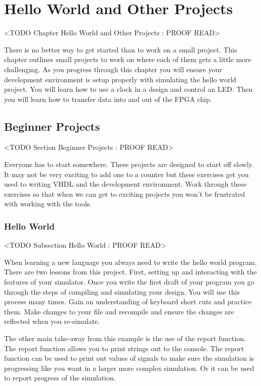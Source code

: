 \chapter{Hello World and Other Projects}
	<TODO Chapter Hello World and Other Projects : PROOF READ>

There is no better way to get started than to work on a small project. This chapter outlines small projects to work on where each of them gets a little more challenging. As you progress through this chapter you will ensure your development environment is setup properly with simulating the hello world project. You will learn how to use a clock in a design and control an \ac{LED}. Then you will learn how to transfer data into and out of the \ac{FPGA} chip. 
	
	
\section{Beginner Projects}
	<TODO Section Beginner Projects : PROOF READ>

Everyone has to start somewhere. These projects are designed to start off slowly. It may not be very exciting to add one to a counter but these exercises get you used to writing \ac{VHDL} and the development environment. Work through these exercises so that when we can get to exciting projects you won't be frustrated with working with the tools. 
	
\subsection{Hello World}
	<TODO Subsection Hello World : PROOF READ>

When learning a new language you always need to write the hello world program. There are two lessons from this project. First, setting up and interacting with the features of your simulator. Once you write the first draft of your program you go through the steps of compiling and simulating your design. You will use this process many times. Gain an understanding of keyboard short cuts and practice them. Make changes to your file and recompile and ensure the changes are reflected when you re-simulate.

The other main take-away from this example is the use of the report function. The report function allows you to print strings out to the console. The report function can be used to print out values of signals to make sure the simulation is progressing like you want in a larger more complex simulation. Or it can be used to report progress of the simulation.      

